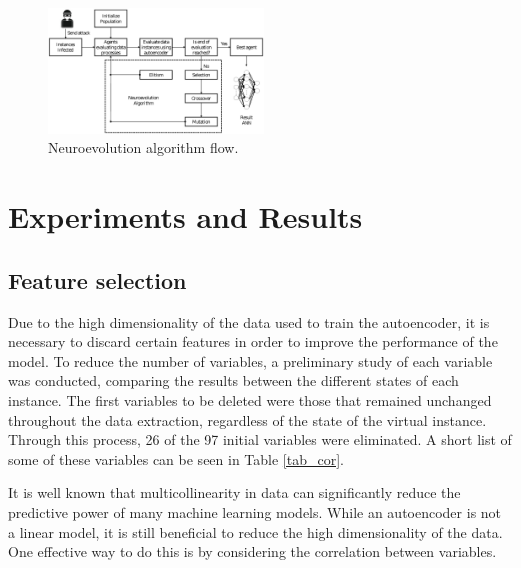 \documentclass{iosart2c}
\begin{document}
\begin{figure}[h!]
\includegraphics[width=0.51\textwidth]{figs/neuroevolution/diag_neuroevolution.eps}
\vspace{-0.5cm}
\caption{Neuroevolution algorithm flow.}
\label{fig:diagneuroevolution}
\end{figure}




\section{Experiments and Results}


\subsection{Feature selection}

Due to the high dimensionality of the data used to train the autoencoder, it is necessary to discard certain features in order to improve the performance of the model. To reduce the number of variables, a preliminary study of each variable was conducted, comparing the results between the different states of each instance. The first variables to be deleted were those that remained unchanged throughout the data extraction, regardless of the state of the virtual instance. Through this process, 26 of the 97 initial variables were eliminated. A short list of some of these variables can be seen in Table \ref{tab_cor}.

It is well known that multicollinearity in data can significantly reduce the predictive power of many machine learning models. While an autoencoder is not a linear model, it is still beneficial to reduce the high dimensionality of the data. One effective way to do this is by considering the correlation between variables.
\end{document}
